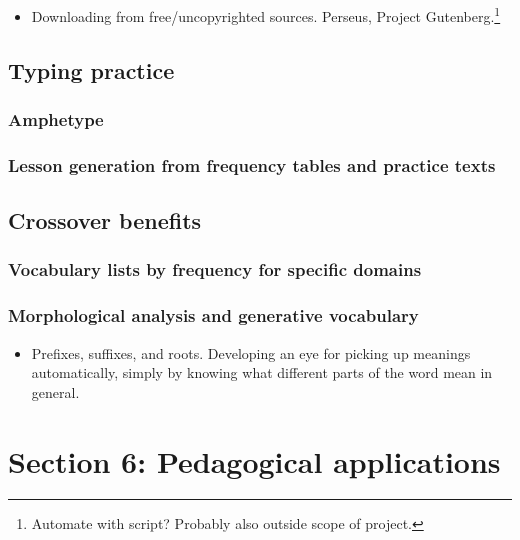 \documentclass[11pt]{article}
\begin{document}
\begin{itemize}
\item Downloading from free/uncopyrighted sources. Perseus, Project Gutenberg.\footnote{Automate with script? Probably also outside scope of project.}
\end{itemize}

\subsection{Typing practice}
\label{sec:org87a55bf}

\subsubsection{Amphetype}
\label{sec:org0d5e86b}

\subsubsection{Lesson generation from frequency tables and practice texts}
\label{sec:orgbcde1bc}

\subsection{Crossover benefits}
\label{sec:orgc07b65d}

\subsubsection{Vocabulary lists by frequency for specific domains}
\label{sec:org306fb4e}

\subsubsection{Morphological analysis and generative vocabulary}
\label{sec:org4b6b83c}

\begin{itemize}
\item Prefixes, suffixes, and roots. Developing an eye for picking up meanings automatically, simply by knowing what different parts of the word mean in general.
\end{itemize}

\section{Section 6: Pedagogical applications}
\label{sec:org9be43ac}
\end{document}
